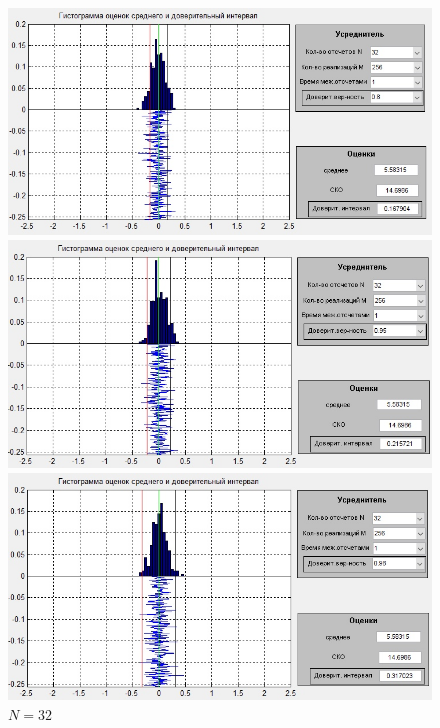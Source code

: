  \begin{figure}[H]
	\begin{minipage}{0.3\linewidth}
		\centering
		\includegraphics[width=\linewidth]{tasks/task6/realize_b1N3}
		\caption*{$\beta =0.8$}
	\end{minipage}
	\begin{minipage}{0.3\linewidth}
		\centering
		\includegraphics[width=\linewidth]{tasks/task6/realize_b2N3}
		\caption*{$\beta =0.95$}
	\end{minipage}
	\begin{minipage}{0.3\linewidth}
		\centering
		\includegraphics[width=\linewidth]{tasks/task6/realize_b3N3}
		\caption*{$\beta =0.98$}
	\end{minipage}
	\caption*{$N=32$}
\end{figure}
